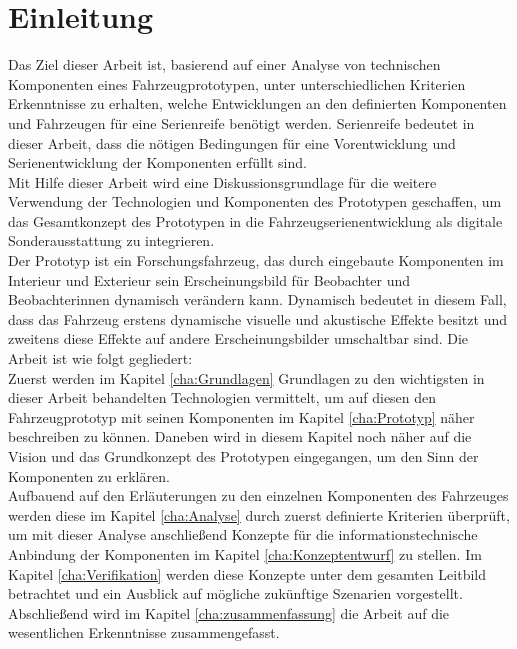 \chapter{Einleitung}
\label{cha:Einleitung}
Das Ziel dieser Arbeit ist, basierend auf einer Analyse von technischen Komponenten eines Fahrzeugprototypen, unter unterschiedlichen Kriterien Erkenntnisse zu erhalten, welche Entwicklungen an den definierten Komponenten und Fahrzeugen für eine Serienreife benötigt werden. Serienreife bedeutet in dieser Arbeit, dass die nötigen Bedingungen für eine Vorentwicklung und Serienentwicklung der Komponenten erfüllt sind.\\
Mit Hilfe dieser Arbeit wird eine Diskussionsgrundlage für die weitere Verwendung der Technologien und Komponenten des Prototypen geschaffen, um das Gesamtkonzept des Prototypen in die Fahrzeugserienentwicklung als digitale Sonderausstattung zu integrieren.\\
Der Prototyp ist ein Forschungsfahrzeug, das durch eingebaute Komponenten im Interieur und Exterieur sein Erscheinungsbild für Beobachter und Beobachterinnen dynamisch verändern kann. Dynamisch bedeutet in diesem Fall, dass das Fahrzeug erstens dynamische visuelle und akustische Effekte besitzt und zweitens diese Effekte auf andere Erscheinungsbilder umschaltbar sind.
Die Arbeit ist wie folgt gegliedert:\\
Zuerst werden im Kapitel \ref{cha:Grundlagen} Grundlagen zu den wichtigsten in dieser Arbeit behandelten Technologien vermittelt, um auf diesen den Fahrzeugprototyp mit seinen Komponenten im Kapitel \ref{cha:Prototyp} näher beschreiben zu können. Daneben wird in diesem Kapitel noch näher auf die Vision und das Grundkonzept des Prototypen eingegangen, um den Sinn der Komponenten zu erklären.\\
Aufbauend auf den Erläuterungen zu den einzelnen Komponenten des Fahrzeuges werden diese im Kapitel \ref{cha:Analyse} durch zuerst definierte Kriterien überprüft, um mit dieser Analyse anschließend Konzepte für die informationstechnische Anbindung der Komponenten im Kapitel \ref{cha:Konzeptentwurf} zu stellen.
Im Kapitel \ref{cha:Verifikation} werden diese Konzepte unter dem gesamten Leitbild betrachtet und ein Ausblick auf mögliche zukünftige Szenarien vorgestellt. Abschließend wird im Kapitel \ref{cha:zusammenfassung} die Arbeit auf die wesentlichen Erkenntnisse zusammengefasst.